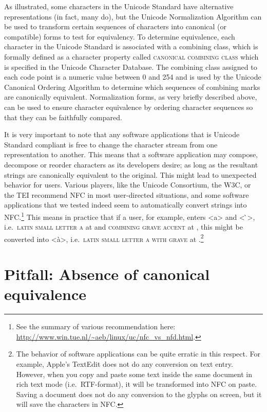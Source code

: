 As illustrated, some characters in the Unicode Standard have alternative
representations (in fact, many do), but the Unicode Normalization Algorithm can
be used to transform certain sequences of characters into canonical (or
compatible) forms to test for equivalency. To determine equivalence, each
character in the Unicode Standard is associated with a combining class, which is
formally defined as a character property called \textsc{canonical combining
class} which is specified in the Unicode Character Database. The combining class
assigned to each code point is a numeric value between 0 and 254 and is used by
the Unicode Canonical Ordering Algorithm to determine which sequences of
combining marks are canonically equivalent. Normalization forms, as very briefly
described above, can be used to ensure character equivalence by ordering
character sequences so that they can be faithfully compared.

It is very important to note that any software applications that is Unicode
Standard compliant is free to change the character stream from one
representation to another. This means that a software application may compose,
decompose or reorder characters as its developers desire; as long as the
resultant strings are canonically equivalent to the original. This might lead to
unexpected behavior for users. Various players, like the Unicode Consortium, the
W{\large 3}C, or the TEI recommend NFC in most user-directed situations, and some
software applications that we tested indeed seem to automatically convert
strings into NFC.\footnote{See the summary of various recommendation here:
\url{http://www.win.tue.nl/~aeb/linux/uc/nfc_vs_nfd.html}.}
This means in practice that if a user, for example, enters <a> and < ̀>,
i.e.~\textsc{latin small letter a} at  and \textsc{combining grave
accent} at , this might be converted into <à>, i.e.~\textsc{latin
small letter a with grave} at .\footnote{The behavior of software
applications can be quite erratic in this respect. For example, Apple's TextEdit
does not do any conversion on text entry. However, when you copy and paste some
text inside the same document in rich text mode (i.e.~RTF-format), it
will be transformed into NFC on paste. Saving a document does not do any
conversion to the glyphs on screen, but it will save the characters in NFC.}

\section{Pitfall: Absence of canonical equivalence}
\label{pitfall-absence-of-equivalence}

